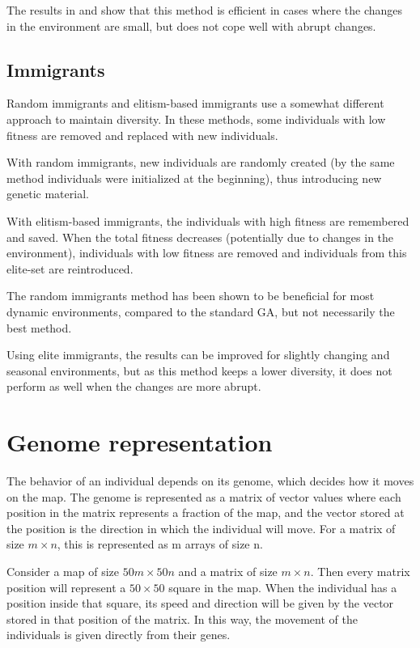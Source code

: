 \documentclass[a4paper,12pt]{article}
\begin{document}
The results in \cite{cobb} and \cite{simoes} show that this method is efficient in cases where the changes in the environment are small, but does not cope well with abrupt changes.


\subsection{Immigrants}
Random immigrants and elitism-based immigrants use a somewhat different approach to maintain diversity. In these methods, some individuals with low fitness are removed and replaced with new individuals.

With random immigrants, new individuals are randomly created (by the same method individuals were initialized at the beginning), thus introducing new genetic material.

With elitism-based immigrants, the individuals with high fitness are remembered and saved. When the total fitness decreases (potentially due to changes in the environment), individuals with low fitness are removed and individuals from this elite-set are reintroduced.

The random immigrants method has been shown to be beneficial for most dynamic environments, compared to the standard GA, but not necessarily the best method\cite{yang}.

Using elite immigrants, the results can be improved for slightly changing and seasonal environments, but as this method keeps a lower diversity, it does not perform as well when the changes are more abrupt.

\section{Genome representation}
The behavior of an individual depends on its genome, which decides how it moves on the map. The genome is represented as a matrix of vector values where each position in the matrix represents a fraction of the map, and the vector stored at the position is the direction in which the individual will move. For a matrix of size $m \times n$, this is represented as m arrays of size n.

Consider a map of size $50m \times 50n$ and a matrix of size $m \times n$. Then every matrix position will represent a $50\times50$ square in the map. When the individual has a position inside that square, its speed and direction will be given by the vector stored in that position of the matrix. In this way, the movement of the individuals is given directly from their genes.
\end{document}
